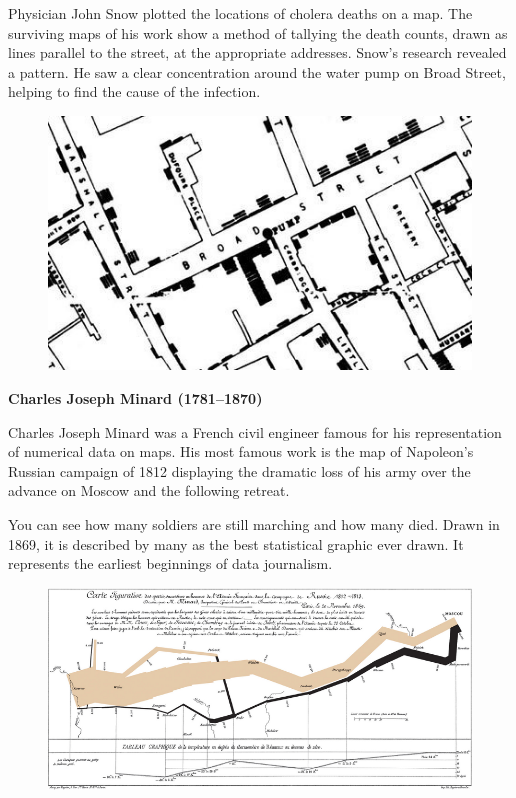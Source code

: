 \documentclass[]{book}
\theoremstyle{definition}
\theoremstyle{definition}
\theoremstyle{definition}
\theoremstyle{remark}
\begin{document}
Physician John Snow plotted the locations of cholera deaths on a map.
The surviving maps of his work show a method of tallying the death
counts, drawn as lines parallel to the street, at the appropriate
addresses. Snow's research revealed a pattern. He saw a clear
concentration around the water pump on Broad Street, helping to find the
cause of the infection.

\begin{figure}
\centering
\includegraphics{images/Snow.png}
\caption{}
\end{figure}

\textbf{Charles Joseph Minard (1781--1870)}

Charles Joseph Minard was a French civil engineer famous for his
representation of numerical data on maps. His most famous work is the
map of Napoleon's Russian campaign of 1812 displaying the dramatic loss
of his army over the advance on Moscow and the following retreat.

You can see how many soldiers are still marching and how many died.
Drawn in 1869, it is described by many as the best statistical graphic
ever drawn. It represents the earliest beginnings of data journalism.

\begin{figure}
\centering
\includegraphics{images/Minard.png}
\caption{}
\end{figure}
\end{document}
